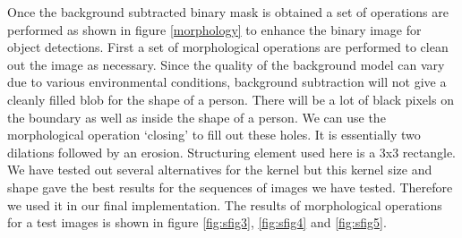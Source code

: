 \documentclass[12pt,a4paper]{report}
\begin{document}
Once the background subtracted binary mask is obtained a set of operations are performed as shown in figure \ref{morphology} to enhance the binary image for object detections. 
First a set of morphological operations are performed to clean out the image as necessary. Since the quality of the background model can vary due to various environmental conditions, background subtraction will not give a cleanly filled blob for the shape of a person. There will be a lot of black pixels on the boundary as well as inside the shape of a person. We can use the morphological operation `closing' to fill out these holes. It is essentially two dilations followed by an erosion. Structuring element used here is a 3x3 rectangle. We have tested out several alternatives for the kernel but this kernel size and shape gave the best results for the sequences of images we have tested. Therefore we used it in our final implementation. The results of morphological operations for a test images is shown in figure \ref{fig:sfig3}, \ref{fig:sfig4} and \ref{fig:sfig5}.\\
\end{document}
